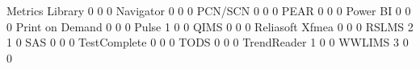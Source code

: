 \documentclass{article}
\begin{document}
\begin{Schunk}
\begin{Soutput}
  Metrics Library                                     0   0       0
  Navigator                                           0   0       0
  PCN/SCN                                             0   0       0
  PEAR                                                0   0       0
  Power BI                                            0   0       0
  Print on Demand                                     0   0       0
  Pulse                                               1   0       0
  QIMS                                                0   0       0
  Reliasoft Xfmea                                     0   0       0
  RSLMS                                               2   1       0
  SAS                                                 0   0       0
  TestComplete                                        0   0       0
  TODS                                                0   0       0
  TrendReader                                         1   0       0
  WWLIMS                                              3   0       0
                                          

\end{Soutput}
\end{Schunk}
\end{document}
